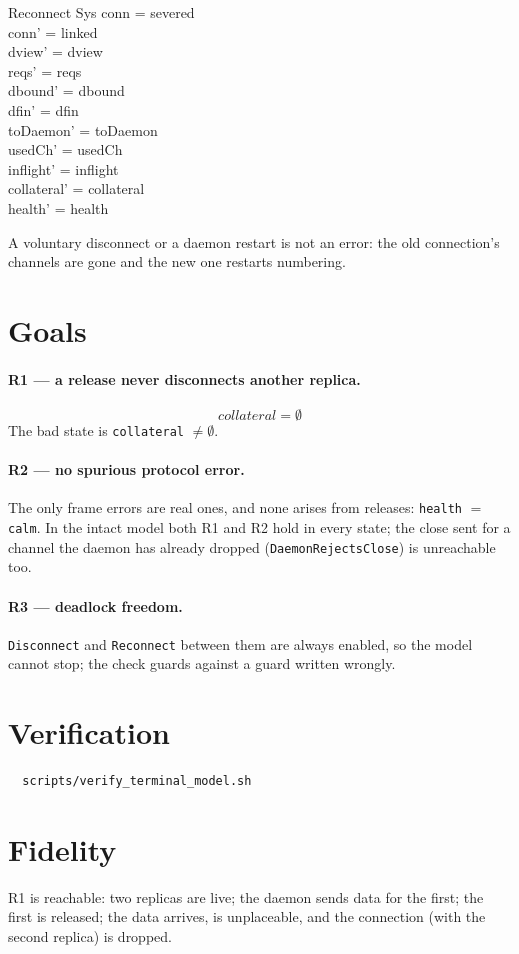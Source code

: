 \documentclass[a4paper,10pt,fleqn]{article}
\begin{document}
\begin{schema}{Reconnect}
  \Delta Sys
\where
  conn = severed \\
  conn' = linked \\
  dview' = dview \\
  reqs' = reqs \\
  dbound' = dbound \\
  dfin' = dfin \\
  toDaemon' = toDaemon \\
  usedCh' = usedCh \\
  inflight' = inflight \\
  collateral' = collateral \\
  health' = health
\end{schema}

A voluntary disconnect or a daemon restart is not an error: the old
connection's channels are gone and the new one restarts numbering.

\section{Goals}

\paragraph{R1 --- a release never disconnects another replica.}
\[
  collateral = \emptyset
\]
The bad state is \texttt{collateral} $\neq \emptyset$.

\paragraph{R2 --- no spurious protocol error.}
The only frame errors are real ones, and none arises from releases:
\texttt{health} $= $ \texttt{calm}.  In the intact model both R1 and R2
hold in every state; the close sent for a channel the daemon has already
dropped (\texttt{DaemonRejectsClose}) is unreachable too.

\paragraph{R3 --- deadlock freedom.}
\texttt{Disconnect} and \texttt{Reconnect} between them are always enabled, so
the model cannot stop; the check guards against a guard written wrongly.

\section{Verification}

\begin{verbatim}
  scripts/verify_terminal_model.sh
\end{verbatim}

\section{Fidelity}

R1 is reachable: two replicas are live; the daemon sends data for the first; the first is released; the data arrives, is unplaceable, and the connection (with the second replica) is dropped.
\end{document}
